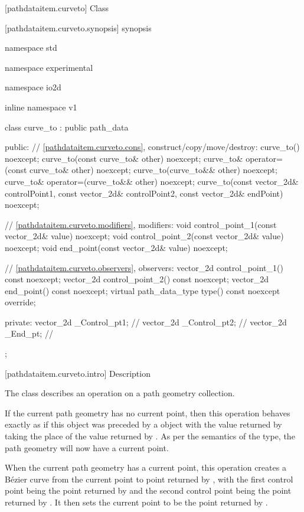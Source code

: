  [pathdataitem.curveto] {Class }

 [pathdataitem.curveto.synopsis] { synopsis}

\begin{codeblock}
namespace std { namespace experimental { namespace io2d { inline namespace v1 {
  class curve_to : public path_data {
  public:
    // \ref{pathdataitem.curveto.cons}, construct/copy/move/destroy:
    curve_to() noexcept;
    curve_to(const curve_to& other) noexcept;
    curve_to& operator=(const curve_to& other) noexcept;
    curve_to(curve_to&& other) noexcept;
    curve_to& operator=(curve_to&& other) noexcept;
    curve_to(const vector_2d& controlPoint1, const vector_2d& controlPoint2,
      const vector_2d& endPoint) noexcept;

    // \ref{pathdataitem.curveto.modifiers}, modifiers:
    void control_point_1(const vector_2d& value) noexcept;
    void control_point_2(const vector_2d& value) noexcept;
    void end_point(const vector_2d& value) noexcept;


    // \ref{pathdataitem.curveto.observers}, observers:
    vector_2d control_point_1() const noexcept;
    vector_2d control_point_2() const noexcept;
    vector_2d end_point() const noexcept;
    virtual path_data_type type() const noexcept override;
    
  private:
    vector_2d _Control_pt1; // \expos
    vector_2d _Control_pt2; // \expos
    vector_2d _End_pt;      // \expos
  };
} } } }
\end{codeblock}

 [pathdataitem.curveto.intro] { Description}

\pnum
{}
The class  describes an operation on a path geometry collection.

\pnum
If the current path geometry has no current point, then this operation behaves exactly as if this object was preceded by a  object with the value returned by  taking the place of the value returned by . As per the semantics of the  type, the path geometry will now have a current point.

\pnum
When the current path geometry has a current point, this operation creates a B\'ezier curve from the current point to point returned by , with the first control point being the point returned by  and the second control point being the point returned by . It then sets the current point to be the point returned by .

